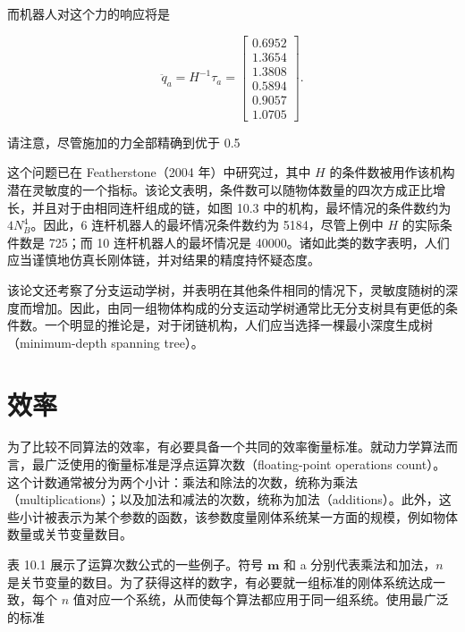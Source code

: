 \documentclass[10pt,a4paper]{book}
\theoremstyle{thmstyle} %
\theoremstyle{defstyle} %
\theoremstyle{prostyle} %
\begin{document}
而机器人对这个力的响应将是



$$
\ddot { q } _ { a } = H ^{- 1} \tau _ { a } = \left[ \begin{array}{l} { 0 . 69 52 } \\{ 1 . 36 54 } \\{ 1 . 38 08 } \\{ 0 . 58 94 } \\{ 0 . 90 57 } \\{ 1 . 07 05 } \end{array} \right] .
$$



请注意，尽管施加的力全部精确到优于 0.5%



这个问题已在 Featherstone（2004 年）中研究过，其中 $H$ 的条件数被用作该机构潜在灵敏度的一个指标。该论文表明，条件数可以随物体数量的四次方成正比增长，并且对于由相同连杆组成的链，如图 10.3 中的机构，最坏情况的条件数约为 $4N_{B}^{4}$。因此，6 连杆机器人的最坏情况条件数约为 5184，尽管上例中 $H$ 的实际条件数是 725；而 10 连杆机器人的最坏情况是 40000。诸如此类的数字表明，人们应当谨慎地仿真长刚体链，并对结果的精度持怀疑态度。



该论文还考察了分支运动学树，并表明在其他条件相同的情况下，灵敏度随树的深度而增加。因此，由同一组物体构成的分支运动学树通常比无分支树具有更低的条件数。一个明显的推论是，对于闭链机构，人们应当选择一棵最小深度生成树（minimum-depth spanning tree）。



\section{效率}





为了比较不同算法的效率，有必要具备一个共同的效率衡量标准。就动力学算法而言，最广泛使用的衡量标准是浮点运算次数（floating-point operations count）。这个计数通常被分为两个小计：乘法和除法的次数，统称为乘法（multiplications）；以及加法和减法的次数，统称为加法（additions）。此外，这些小计被表示为某个参数的函数，该参数度量刚体系统某一方面的规模，例如物体数量或关节变量数目。



表 10.1 展示了运算次数公式的一些例子。符号 $\mathbf{m}$ 和 a 分别代表乘法和加法，$n$ 是关节变量的数目。为了获得这样的数字，有必要就一组标准的刚体系统达成一致，每个 $n$ 值对应一个系统，从而使每个算法都应用于同一组系统。使用最广泛的标准
\end{document}

